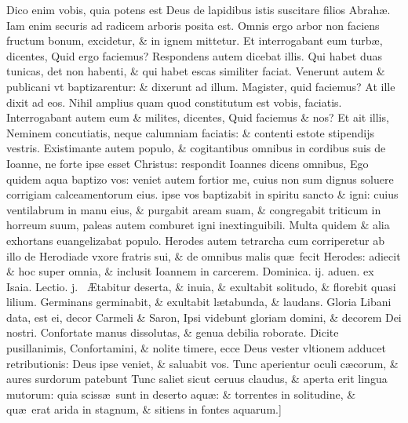 \documentclass[a5paper,10pt]{book}
\def\leftmarginnote{%
	\lrmarginnote{\hskip -\marginparsep \hskip -6.5em}}
\def\ae{æ}
\def\AE{Æ}
\begin{document}
\begin{multicols*}{2}
Dico enim vobis, quia potens est Deus de lapidibus istis suscitare filios Abrah\ae .
Iam enim securis ad radicem arboris posita est.
Omnis ergo arbor non faciens fructum bonum, excidetur, \& in ignem mittetur.
Et interrogabant eum turb\ae , dicentes, Quid ergo faciemus?
Respondens autem dicebat illis. Qui habet duas tunicas, det non habenti, \& qui habet escas similiter faciat.
Venerunt autem \& publicani vt baptizarentur: \& dixerunt ad illum. Magister, quid faciemus? At ille dixit ad eos. Nihil amplius quam quod constitutum est vobis, faciatis.
Interrogabant autem eum \& milites, dicentes, Quid faciemus \& nos? Et ait illis, Neminem concutiatis, neque calumniam faciatis: \& contenti estote stipendijs vestris.
Existimante autem populo, \& cogitantibus omnibus in cordibus suis de Ioanne, ne forte ipse esset Christus: respondit Ioannes dicens omnibus, Ego quidem aqua baptizo vos: veniet autem fortior me,
cuius non sum dignus soluere corrigiam calceamentorum eius. ipse vos baptizabit in spiritu sancto \& igni: cuius ventilabrum in manu eius, \& purgabit aream suam, \& congregabit triticum in horreum suum, paleas autem comburet igni inextinguibili.
Multa quidem \& alia exhortans euangelizabat populo.
Herodes autem tetrarcha cum corriperetur ab illo de Herodiade vxore fratris sui, \& de omnibus malis qu\ae \ fecit Herodes: adiecit \& hoc super omnia, \& inclusit Ioannem in carcerem.
\newline {} \color{red} \hypertarget{SUN-SECUNDA-ADV}{Dominica. ij. aduen.} ex Isaia. \hfill Lectio. j. \color{black}
\vspace{-1.25em}
\textdagger \ \AE tabitur\leftmarginnote{\begin{flushright}c. 35.\\a\end{flushright}} deserta, \& inuia, \& exultabit solitudo, \& florebit quasi lilium.
Germinans germinabit, \& exultabit l\ae tabunda, \& laudans.
Gloria Libani data, est ei, decor Carmeli \& Saron, Ipsi videbunt gloriam domini, \& decorem Dei nostri.
Confortate manus dissolutas, \& genua debilia roborate.
Dicite pusillanimis, Confortamini, \& nolite timere, ecce Deus vester vltionem adducet retributionis: Deus ipse veniet, \& saluabit vos.
Tunc aperientur oculi c\ae corum, \& aures surdorum patebunt
Tunc saliet sicut ceruus claudus, \& aperta erit lingua mutorum: quia sciss\ae \ sunt in deserto aqu\ae : \& torrentes in solitudine, \& qu\ae \ erat arida in stagnum, \& sitiens in fontes aquarum.]

\end{multicols*}
\end{document}
